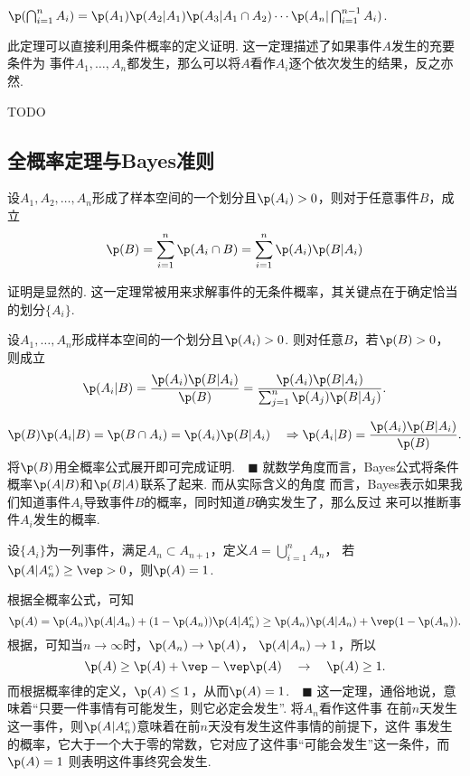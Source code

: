   \begin{thm}[乘法法则]
    $\p(\bigcap_{i=1}^n A_i) = \p(A_1)\p(A_2|A_1)\p(A_3|A_1\cap A_2)\cdots
     \p(A_n|\bigcap_{i=1}^{n-1}A_i)$.
  \end{thm}
  \remark
    此定理可以直接利用条件概率的定义证明. 这一定理描述了如果事件$A$发生的充要条件为
    事件$A_1,\dots,A_n$都发生，那么可以将$A$看作$A_i$逐个依次发生的结果，反之亦然.

  \begin{ex}
    TODO
  \end{ex}


\subsection{全概率定理与Bayes准则}

  \begin{thm}[全概率定理]
    设$A_1,A_2,\dots,A_n$形成了样本空间的一个划分且$\p(A_i)>0$，则对于任意事件$B$，成立
    \[
      \p(B) = \sum_{i=1}^n\p(A_i\cap B) = \sum_{i=1}^n\p(A_i)\p(B|A_i)
    \]
  \end{thm}
  \remark
    证明是显然的. 这一定理常被用来求解事件的无条件概率，其关键点在于确定恰当的划分$\{A_i\}$.

  \begin{thm}[Bayes准则]
    设$A_1,\dots,A_n$形成样本空间的一个划分且$\p(A_i)>0$. 则对任意$B$，若$\p(B)>0$，
    则成立
    \[
      \p(A_i|B) = \frac{\p(A_i)\p(B|A_i)}{\p(B)} 
        = \frac{\p(A_i)\p(B|A_i)}{\sum_{j=1}^n \p(A_j)\p(B|A_j)}. 
    \]
  \end{thm}
  \proof
    \[
      \p(B)\p(A_i|B) = \p(B\cap A_i) = \p(A_i)\p(B|A_i) \quad\Rightarrow
      \p(A_i|B) = \frac{\p(A_i)\p(B|A_i)}{\p(B)}.
    \]
    将$\p(B)$用全概率公式展开即可完成证明.$\quad\blacksquare$
  \remark
    就数学角度而言，Bayes公式将条件概率$\p(A|B)$和$\p(B|A)$联系了起来. 而从实际含义的角度
    而言，Bayes表示如果我们知道事件$A_i$导致事件$B$的概率，同时知道$B$确实发生了，那么反过
    来可以推断事件$A_i$发生的概率. 

  \begin{thm}[Murphy]
    设$\{A_i\}$为一列事件，满足$A_n\subset A_{n+1}$，定义$A=\bigcup_{i=1}^nA_n$，
    若$\p(A|A_n^c)\ge\vep>0$，则$\p(A)=1$.
  \end{thm}
  \proof
    根据全概率公式，可知
    \[
      \p(A) = \p(A_n)\p(A|A_n) + (1-\p(A_n))\p(A|A_n^c) 
       \ge \p(A_n)\p(A|A_n) + \vep(1-\p(A_n)).
    \]
    根据，可知当$n\to\infty$时，$\p(A_n)\to\p(A)$，
    $\p(A|A_n)\to 1$，所以
    \[
      \p(A) \ge \p(A) + \vep - \vep \p(A)\quad\rightarrow\quad
      \p(A) \ge 1.
    \]
    而根据概率律的定义，$\p(A)\le 1$，从而$\p(A)=1$.$\quad\blacksquare$
  \remark
    这一定理，通俗地说，意味着“只要一件事情有可能发生，则它必定会发生”. 将$A_n$看作这件事
    在前$n$天发生这一事件，则$\p(A|A_n^c)$意味着在前$n$天没有发生这件事情的前提下，这件
    事发生的概率，它大于一个大于零的常数，它对应了这件事“可能会发生”这一条件，而$\p(A)=1$
    则表明这件事终究会发生.

